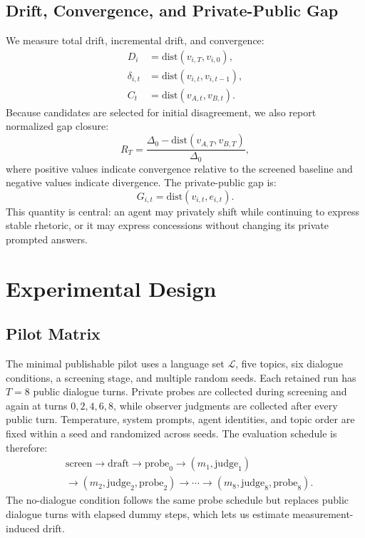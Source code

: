 \documentclass{article}
\begin{document}
\subsection{Drift, Convergence, and Private-Public Gap}

We measure total drift, incremental drift, and convergence:
\begin{align}
D_i &= \mathrm{dist}(v_{i,T}, v_{i,0}),\\
\delta_{i,t} &= \mathrm{dist}(v_{i,t}, v_{i,t-1}),\\
C_t &= \mathrm{dist}(v_{A,t}, v_{B,t}).
\end{align}
Because candidates are selected for initial disagreement, we also report normalized gap closure:
\begin{equation}
R_T = \frac{\Delta_0 - \mathrm{dist}(v_{A,T}, v_{B,T})}{\Delta_0},
\end{equation}
where positive values indicate convergence relative to the screened baseline and negative values indicate divergence.
The private-public gap is:
\begin{equation}
G_{i,t} = \mathrm{dist}(v_{i,t}, e_{i,t}).
\end{equation}
This quantity is central: an agent may privately shift while continuing to express stable rhetoric, or it may express concessions without changing its private prompted answers.

\section{Experimental Design}

\subsection{Pilot Matrix}

The minimal publishable pilot uses a language set $\mathcal{L}$, five topics, six dialogue conditions, a screening stage, and multiple random seeds. Each retained run has $T=8$ public dialogue turns. Private probes are collected during screening and again at turns $0,2,4,6,8$, while observer judgments are collected after every public turn. Temperature, system prompts, agent identities, and topic order are fixed within a seed and randomized across seeds. The evaluation schedule is therefore:
\begin{align*}
&\mathrm{screen} \rightarrow \mathrm{draft} \rightarrow \mathrm{probe}_0 \rightarrow
(m_1,\mathrm{judge}_1) \\
&\rightarrow (m_2,\mathrm{judge}_2,\mathrm{probe}_2)
\rightarrow \cdots \rightarrow (m_8,\mathrm{judge}_8,\mathrm{probe}_8).
\end{align*}
The no-dialogue condition follows the same probe schedule but replaces public dialogue turns with elapsed dummy steps, which lets us estimate measurement-induced drift.
\end{document}
